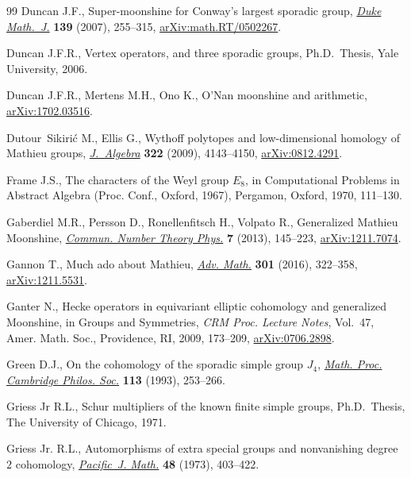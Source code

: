 \documentclass[pdftex]{sigma}
\numberwithin{equation}{section}
\newcommand\<\langle
\renewcommand\>\rangle
\begin{document}
\begin{thebibliography}{99}
Duncan J.F., Super-moonshine for {C}onway's largest sporadic group,
 \href{https://doi.org/10.1215/S0012-7094-07-13922-X}{\textit{Duke Math.~J.}} \textbf{139} (2007), 255--315,
 \href{https://arxiv.org/abs/math.RT/0502267}{arXiv:math.RT/0502267}.

Duncan J.F.R., Vertex operators, and three sporadic groups, Ph.D.~Thesis, Yale
 University, 2006.

Duncan J.F.R., Mertens M.H., Ono K., O'Nan moonshine and arithmetic,
 \href{https://arxiv.org/abs/1702.03516}{arXiv:1702.03516}.

Dutour~Sikiri\'{c} M., Ellis G., Wythoff polytopes and low-dimensional homology
 of {M}athieu groups, \href{https://doi.org/10.1016/j.jalgebra.2009.09.031}{\textit{J.~Algebra}} \textbf{322} (2009), 4143--4150,
 \href{https://arxiv.org/abs/0812.4291}{arXiv:0812.4291}.

Frame J.S., The characters of the {W}eyl group {$E_{8}$}, in Computational
 {P}roblems in {A}bstract {A}lgebra ({P}roc. {C}onf., {O}xford, 1967),
 Pergamon, Oxford, 1970, 111--130.

Gaberdiel M.R., Persson D., Ronellenfitsch H., Volpato R., Generalized
 {M}athieu {M}oonshine, \href{https://doi.org/10.4310/CNTP.2013.v7.n1.a5}{\textit{Commun. Number Theory Phys.}} \textbf{7}
 (2013), 145--223, \href{https://arxiv.org/abs/1211.7074}{arXiv:1211.7074}.

Gannon T., Much ado about {M}athieu, \href{https://doi.org/10.1016/j.aim.2016.06.014}{\textit{Adv. Math.}} \textbf{301} (2016),
 322--358, \href{https://arxiv.org/abs/1211.5531}{arXiv:1211.5531}.

Ganter N., Hecke operators in equivariant elliptic cohomology and generalized
 {M}oonshine, in Groups and Symmetries, \textit{CRM Proc. Lecture Notes},
 Vol.~47, Amer. Math. Soc., Providence, RI, 2009, 173--209,
 \href{https://arxiv.org/abs/0706.2898}{arXiv:0706.2898}.

Green D.J., On the cohomology of the sporadic simple group {$J_4$},
 \href{https://doi.org/10.1017/S0305004100075940}{\textit{Math. Proc. Cambridge Philos. Soc.}} \textbf{113} (1993), 253--266.

Griess Jr R.L., Schur multipliers of the known finite simple groups, Ph.D.~Thesis, The University of Chicago, 1971.

Griess Jr. R.L., Automorphisms of extra special groups and nonvanishing degree
 {$2$} cohomology, \href{https://doi.org/10.2140/pjm.1973.48.403}{\textit{Pacific~J. Math.}} \textbf{48} (1973), 403--422.


\end{thebibliography}
\end{document}
